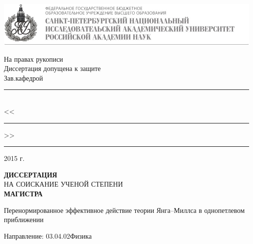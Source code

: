 
\begin{titlepage}
\begin{center}
\vspace*{-2cm}
\includegraphics[width=\textwidth]{img/logo2.jpg}

\vspace{1cm}
\begin{flushright}
	\begin{minipage}{0.45\textwidth}
		\begin{center}
На правах рукописи\\
Диссертация допущена к защите\\
Зав.кафедрой\\[2mm]
\rule{5cm}{0.5pt}\\
<<\rule{0.7cm}{0.5pt}>> \rule{2.5cm}{0.5pt}  2015 г.
		\end{center}
	\end{minipage}
\end{flushright}

\vspace{2cm}
{\bf ДИССЕРТАЦИЯ}\\
НА СОИСКАНИЕ УЧЕНОЙ СТЕПЕНИ\\
{\bf МАГИСТРА}

\vspace{1cm}
{\Large Перенормированное эффективное действие теории Янга--Миллса в однопетлевом приближении}\\
\vspace{1cm}
\begin{flushleft}
Направление: 03.04.02\hspace{0.7cm}Физика

\vspace{1cm}


\end{flushleft}
\end{center}
\end{titlepage}
